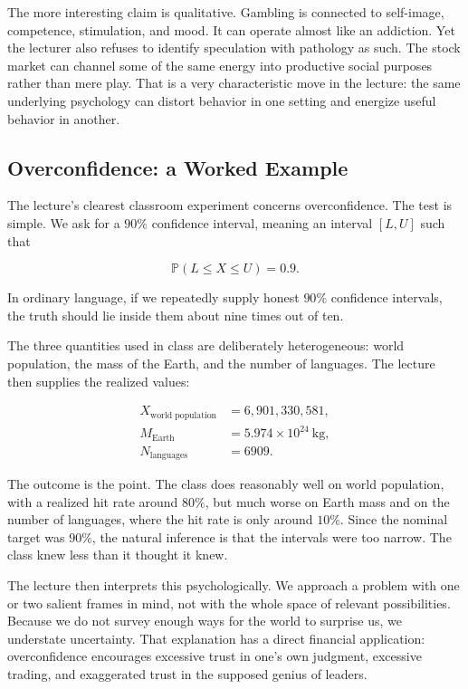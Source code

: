 The more interesting claim is qualitative. Gambling is connected to self-image, competence, stimulation, and mood. It can operate almost like an addiction. Yet the lecturer also refuses to identify speculation with pathology as such. The stock market can channel some of the same energy into productive social purposes rather than mere play. That is a very characteristic move in the lecture: the same underlying psychology can distort behavior in one setting and energize useful behavior in another.

\subsection{Overconfidence: a Worked Example}

The lecture's clearest classroom experiment concerns overconfidence. The test is simple. We ask for a \(90\%\) confidence interval, meaning an interval \([L,U]\) such that

\begin{equation}
\mathbb{P}(L\le X\le U)=0.9.
\end{equation}

In ordinary language, if we repeatedly supply honest \(90\%\) confidence intervals, the truth should lie inside them about nine times out of ten.

The three quantities used in class are deliberately heterogeneous: world population, the mass of the Earth, and the number of languages. The lecture then supplies the realized values:

\begin{align}
X_{\text{world population}} &= 6{,}901{,}330{,}581,\\
M_{\text{Earth}} &= 5.974\times 10^{24}\ \text{kg},\\
N_{\text{languages}} &= 6909.
\end{align}

The outcome is the point. The class does reasonably well on world population, with a realized hit rate around \(80\%\), but much worse on Earth mass and on the number of languages, where the hit rate is only around \(10\%\). Since the nominal target was \(90\%\), the natural inference is that the intervals were too narrow. The class knew less than it thought it knew.

The lecture then interprets this psychologically. We approach a problem with one or two salient frames in mind, not with the whole space of relevant possibilities. Because we do not survey enough ways for the world to surprise us, we understate uncertainty. That explanation has a direct financial application: overconfidence encourages excessive trust in one's own judgment, excessive trading, and exaggerated trust in the supposed genius of leaders.

